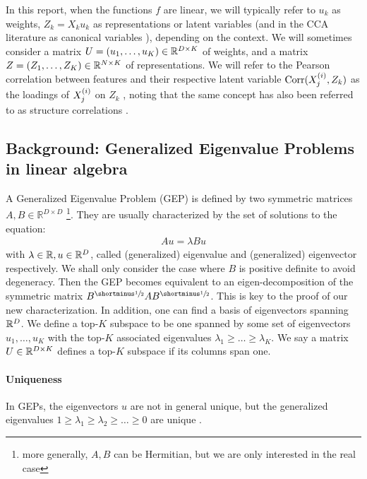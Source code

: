 In this report, when the functions $f$ are linear, we will typically refer to $u_k$ as \gls{weights}, $Z_k = X_k u_k$ as \gls{representations} or \gls{latent variables} (and in the CCA literature as canonical variables \citep{borga_learning_1998}), depending on the context.
We will sometimes consider a matrix $U = \left(u_1, \dots, u_K\right) \in \mathbb{R}^{D \times K}$ of \gls{weights}, and a matrix $Z = \left(Z_1, \dots, Z_K\right) \in \mathbb{R}^{N \times K}$ of representations.
We will refer to the Pearson correlation between features and their respective latent variable $\operatorname{Corr}(X^{(i)}_j, Z_k)$ as the \gls{loadings} of $X^{(i)}_j$ on $Z_k$ \citep{rosipal2005overview, alpert1972interpretation, borga_learning_1998}, noting that the same concept has also been referred to as structure correlations \citep{meredith1964canonical}.

\subsection{Background: Generalized Eigenvalue Problems in linear algebra}
A Generalized Eigenvalue Problem (GEP) is defined by two symmetric matrices $A,B\in \mathbb{R}^{D\times D}$ \citep{stewart_matrix_1990}\footnote{more generally, $A,B$ can be Hermitian, but we are only interested in the real case}.
They are usually characterized by the set of solutions to the equation:
\begin{align}
    \label{eq:igep}
    Au=\lambda Bu
\end{align}
with $\lambda \in \mathbb{R}, u \in \mathbb{R}^D$, called (generalized) eigenvalue and (generalized) eigenvector respectively.
We shall only consider the case where $B$ is positive definite to avoid degeneracy.
Then the GEP becomes equivalent to an eigen-decomposition of the symmetric matrix $B^\mhalf A B^\mhalf$.
This is key to the proof of our new characterization.
In addition, one can find a basis of eigenvectors spanning $\mathbb{R}^D$.
We define a top-$K$ subspace to be one spanned by some set of eigenvectors {$u_1,\dots,u_K$} with the top-$K$ associated eigenvalues $\lambda_1 \geq \dots \geq \lambda_K$.
We say a matrix $U \in \mathbb{R}^{D \times K}$ defines a top-$K$ subspace if its columns span one.

\paragraph{Uniqueness}
In GEPs, the eigenvectors $u$ are not in general unique, but the generalized eigenvalues $1 \geq \lambda_1 \geq \lambda_2 \geq \dots \geq 0$ are unique \citep{mills1988calculation}.

